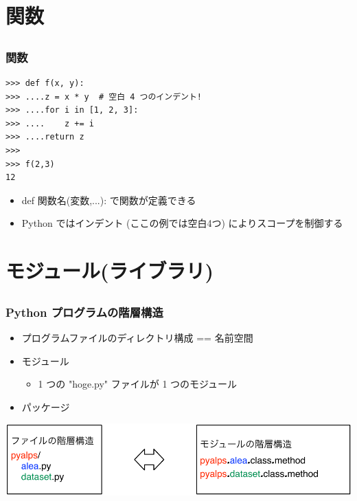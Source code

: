 \section{関数}

\subsection*{\redm\whiteb\greenb}
\begin{frame}[t,fragile]
\frametitle{関数}
\begin{lstlisting}
>>> def f(x, y):
>>> ....z = x * y  # 空白 4 つのインデント!
>>> ....for i in [1, 2, 3]:
>>> ....    z += i
>>> ....return z
>>>
>>> f(2,3)
12
\end{lstlisting}
\begin{itemize}
\item def 関数名(変数,...): で関数が定義できる
\item Python ではインデント (ここの例では空白4つ) によりスコープを制御する
\end{itemize}
\end{frame}

\section{モジュール(ライブラリ)}

\subsection*{\redm\whiteb\greenb}
\begin{frame}[t]
\frametitle{Python プログラムの階層構造}
\begin{itemize}
\item プログラムファイルのディレクトリ構成 == 名前空間
\item モジュール
\begin{itemize}
 \item 1 つの "hoge.py" ファイルが 1 つのモジュール
\end{itemize}
\item パッケージ
\end{itemize}
\includegraphics[width=\textwidth]{module.pdf}
\end{frame}

